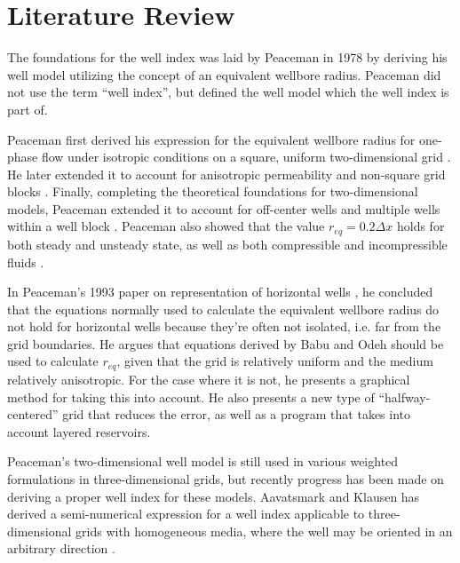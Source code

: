 
\section{Literature Review} %
\label{sec:literature_review}
The foundations for the well index was laid by Peaceman in 1978 \cite{Aavatsmark2003Well} by deriving his well model utilizing the concept of an equivalent wellbore radius. Peaceman did not use the term ``well index'', but defined the well model which the well index is part of.

Peaceman first derived his expression for the equivalent wellbore radius for one-phase flow under isotropic conditions on a square, uniform two-dimensional grid \cite{Peaceman1978Interpretation}. He later extended it to account for anisotropic permeability and non-square grid blocks \cite{Peaceman1983Interpretation}. Finally, completing the theoretical foundations for two-dimensional models, Peaceman extended it to account for off-center wells and multiple wells within a well block \cite{Peaceman1990Interpretation}. Peaceman also showed that the value $r_{eq}=0.2 \Delta x$ holds for both steady and unsteady state, as well as both compressible and incompressible fluids \cite{Peaceman1978Interpretation}.

In Peaceman's 1993 paper on representation of horizontal wells \cite{Peaceman1993Representation}, he concluded that the equations normally used to calculate the equivalent wellbore radius do not hold for horizontal wells because they're often not isolated, i.e. far from the grid boundaries. He argues that equations derived by Babu and Odeh \cite{Babu1991Relation} should be used to calculate $r_{eq}$, given that the grid is relatively uniform and the medium relatively anisotropic. For the case where it is not, he presents a graphical method for taking this into account. He also presents a new type of ``halfway-centered'' grid that reduces the error, as well as a program that takes into account layered reservoirs.

Peaceman's two-dimensional well model is still used in various weighted formulations in three-dimensional grids, but recently progress has been made on deriving a proper well index for these models. Aavatsmark and Klausen has derived a semi-numerical expression for a well index applicable to three-dimensional grids with homogeneous media, where the well may be oriented in an arbitrary direction \cite{Aavatsmark2003Well}.

